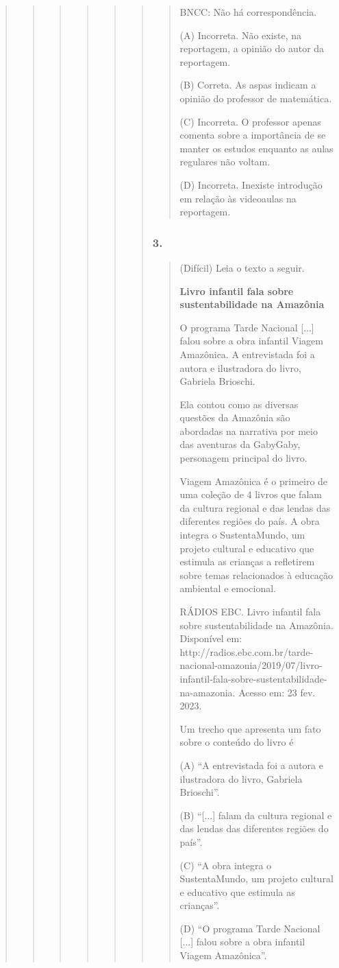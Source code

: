 \begin{quote}
\begin{quote}
\begin{quote}
\begin{quote}
\begin{quote}
\begin{quote}
\begin{quote}
BNCC: Não há correspondência.

(A) Incorreta. Não existe, na reportagem, a opinião do autor da
reportagem.

(B) Correta. As aspas indicam a opinião do professor de matemática.

(C) Incorreta. O professor apenas comenta sobre a importância de se
manter os estudos enquanto as aulas regulares não voltam.

(D) Incorreta. Inexiste introdução em relação às videoaulas na
reportagem.
\end{quote}

\subsubsection{3.}\label{section-65}

\begin{quote}
(Difícil) Leia o texto a seguir.

\textbf{Livro infantil fala sobre sustentabilidade na Amazônia}

O programa Tarde Nacional {[}...{]} falou sobre a obra infantil Viagem
Amazônica. A entrevistada foi a autora e ilustradora do livro, Gabriela
Brioschi.

Ela contou como as diversas questões da Amazônia são abordadas na
narrativa por meio das aventuras da GabyGaby, personagem principal do
livro.~

Viagem Amazônica é o primeiro de uma coleção de 4 livros que falam da
cultura regional e das lendas das diferentes regiões do país. A obra
integra o SustentaMundo, um projeto cultural e educativo que estimula as
crianças a refletirem sobre temas relacionados à educação ambiental e
emocional.

RÁDIOS EBC. Livro infantil fala sobre sustentabilidade na Amazônia.
Disponível em:
http://radios.ebc.com.br/tarde-nacional-amazonia/2019/07/livro-infantil-fala-sobre-sustentabilidade-na-amazonia.
Acesso em: 23 fev. 2023.

Um trecho que apresenta um fato sobre o conteúdo do livro é

(A) ``A entrevistada foi a autora e ilustradora do livro, Gabriela
Brioschi''.

(B) ``{[}...{]} falam da cultura regional e das lendas das diferentes
regiões do país''.

(C) ``A obra integra o SustentaMundo, um projeto cultural e educativo
que estimula as crianças''.

(D) ``O programa Tarde Nacional {[}...{]} falou sobre a obra infantil
Viagem Amazônica''.


\end{quote}
\end{quote}
\end{quote}
\end{quote}
\end{quote}
\end{quote}
\end{quote}
